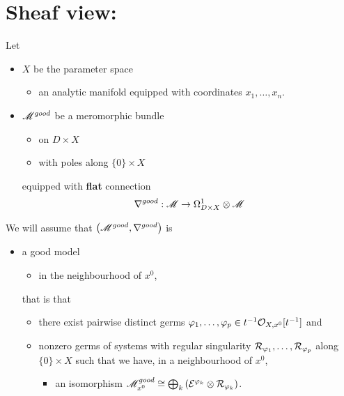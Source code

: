 \section{Sheaf view: \cite{sabbah2007isomonodromic}} %
Let
\begin{itemize}
  \item $X$ be the \textcolor{green!40!black}{parameter space}
    \begin{itemize}
      \item an analytic manifold equipped with coordinates $x_1,\ldots,x_n$.
    \end{itemize}
  \item $\mathscr{M}^{good}$ be a meromorphic bundle
    \begin{itemize}
      \item on $D\times X$
      \item with poles along $\{0\}\times X$
    \end{itemize}
    equipped with \textbf{flat} connection
    \[
      \nabla^{good}:\mathscr{M}\to\Omega_{D\times X}^1\otimes\mathscr{M}
    \]
\end{itemize}
We will assume that $\left(\mathscr{M}^{good},\nabla^{good}\right)$ is 
\begin{itemize}
  \item a good model
    \begin{itemize}
      \item in the neighbourhood of $x^0$,
    \end{itemize}
    that is that
    \begin{itemize}
      \item there exist pairwise distinct germs $\varphi_1,\dots,\varphi_p\in
        t^{-1}\mathcal{O}_{X,x^0}[t^{-1}]$ and
      \item nonzero germs of systems with regular singularity
        $\mathcal{R}_{\varphi_1},\dots,\mathcal{R}_{\varphi_p}$ along $\{0\}\times X$ such that
            we have, in a neighbourhood of $x^0$,
        \begin{itemize}
          \item an isomorphism $\mathscr{M}_{x^0}^{good}
            \cong\bigoplus_k\left(\mathcal{E}^{\varphi_k}\otimes\mathcal{R}_{\varphi_k}\right)$.
        \end{itemize}
    \end{itemize}
\end{itemize}
\begin{comment}
  $k\neq l$ $\overset{\text{II.5.6}}{\Rightarrow{}}$ the order of the pole with
  respect to $t$ of $(\phi_k-\phi_l)(x,t)$ does not depend on $x$ in a
  neighbourhood of $x^0$.
\end{comment}

